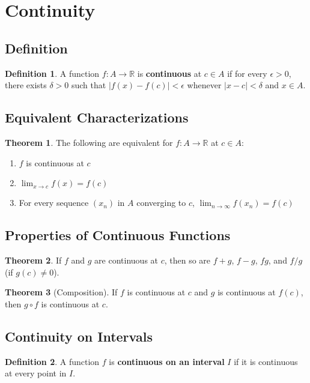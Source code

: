 \documentclass[11pt]{article}
\theoremstyle{definition}
\newtheorem{definition}{Definition}[section]
\newtheorem{theorem}{Theorem}[section]
\begin{document}
\section{Continuity}

\subsection{Definition}
\begin{definition}
A function $f: A \to \mathbb{R}$ is \textbf{continuous} at $c \in A$ if for every $\epsilon > 0$, there exists $\delta > 0$ such that $|f(x) - f(c)| < \epsilon$ whenever $|x - c| < \delta$ and $x \in A$.
\end{definition}

\subsection{Equivalent Characterizations}
\begin{theorem}
The following are equivalent for $f: A \to \mathbb{R}$ at $c \in A$:
\begin{enumerate}
    \item $f$ is continuous at $c$
    \item $\lim_{x \to c} f(x) = f(c)$
    \item For every sequence $(x_n)$ in $A$ converging to $c$, $\lim_{n \to \infty} f(x_n) = f(c)$
\end{enumerate}
\end{theorem}

\subsection{Properties of Continuous Functions}
\begin{theorem}
If $f$ and $g$ are continuous at $c$, then so are $f + g$, $f - g$, $fg$, and $f/g$ (if $g(c) \neq 0$).
\end{theorem}

\begin{theorem}[Composition]
If $f$ is continuous at $c$ and $g$ is continuous at $f(c)$, then $g \circ f$ is continuous at $c$.
\end{theorem}

\subsection{Continuity on Intervals}
\begin{definition}
A function $f$ is \textbf{continuous on an interval} $I$ if it is continuous at every point in $I$.
\end{definition}
\end{document}
